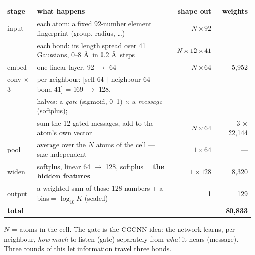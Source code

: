 \begin{frame}

\begin{center}
{\sffamily\scriptsize
\begin{tabular}{@{}llrr@{}}
\toprule
\textbf{stage} & \textbf{what happens} & \textbf{shape out} & \textbf{weights} \\
\midrule
input   & each atom: a fixed 92-number element fingerprint (group, radius, \ldots)
        & $N \times 92$ & --- \\
        & each bond: its length spread over 41 Gaussians, 0--8 \AA\ in 0.2 \AA\ steps
        & $N \times 12 \times 41$ & --- \\
embed   & one linear layer, 92 $\rightarrow$ 64 & $N \times 64$ & 5{,}952 \\
conv $\times$3 & per neighbour: [self 64 $\Vert$ neighbour 64 $\Vert$ bond 41] = 169 $\rightarrow$ 128,
          & & \\
        & \quad halves: a \emph{gate} (sigmoid, 0--1) $\times$ a \emph{message} (softplus);
          & & \\
        & \quad sum the 12 gated messages, add to the atom's own vector
          & $N \times 64$ & 3 $\times$ 22{,}144 \\
pool    & average over the $N$ atoms of the cell --- size-independent
        & $1 \times 64$ & --- \\
widen   & softplus, linear 64 $\rightarrow$ 128, softplus = \textbf{the hidden features}
        & $1 \times 128$ & 8{,}320 \\
output  & a weighted sum of those 128 numbers + a bias = $\log_{10} K$ (scaled)
        & 1 & 129 \\
\midrule
\textbf{total} & & & \textbf{80{,}833} \\
\bottomrule
\end{tabular}}
\end{center}

\vspace{2pt}
{\sffamily\scriptsize
$N$ = atoms in the cell. The gate is the CGCNN idea: the network learns, per
neighbour, \emph{how much} to listen (gate) separately from \emph{what} it hears
(message). Three rounds of this let information travel three bonds.\par}

\end{frame}

